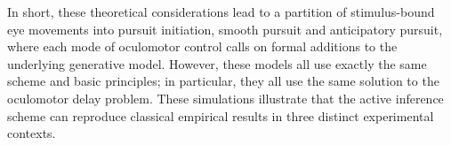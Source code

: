 \documentclass[a4paper]{article} %
\begin{document}
In short, these theoretical considerations lead to a partition of stimulus-bound
eye movements into pursuit initiation, smooth pursuit and anticipatory pursuit,
where each mode of oculomotor control calls on formal additions to the
underlying generative model. However, these models all use exactly the same
scheme and basic principles; in particular, they all use the same solution to
the oculomotor delay problem. These simulations illustrate that the active
inference scheme can reproduce classical empirical results in three distinct
experimental contexts.
\end{document}

